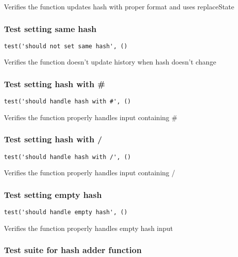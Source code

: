 \documentclass[a4paper]{article}
\begin{document}
Verifies the function updates hash with proper format
and uses replaceState

\hypertarget{toc205}{}
\subsubsection{Test setting same hash}

\begin{lstlisting}
test('should not set same hash', ()
\end{lstlisting}

Verifies the function doesn't update history when hash doesn't change

\hypertarget{toc206}{}
\subsubsection{Test setting hash with \#}

\begin{lstlisting}
test('should handle hash with #', ()
\end{lstlisting}

Verifies the function properly handles input containing \#

\hypertarget{toc207}{}
\subsubsection{Test setting hash with /}

\begin{lstlisting}
test('should handle hash with /', ()
\end{lstlisting}

Verifies the function properly handles input containing /

\hypertarget{toc208}{}
\subsubsection{Test setting empty hash}

\begin{lstlisting}
test('should handle empty hash', ()
\end{lstlisting}

Verifies the function properly handles empty hash input

\hypertarget{toc209}{}
\subsubsection{Test suite for hash adder function}
\end{document}
